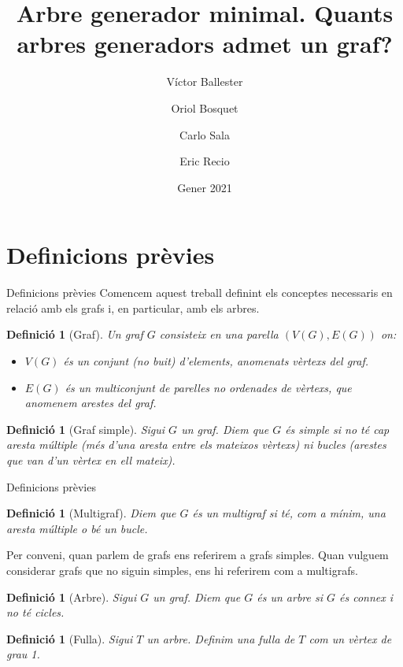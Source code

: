 \documentclass{beamer}
\institute[UAB]{Universitat Autònoma de Barcelona}
\title[Quants arbres generadors admet un graf?]{Arbre generador minimal. Quants arbres generadors admet un graf?}
\author[Víctor, Oriol, Eric, Carlo]{Víctor Ballester\and Oriol Bosquet \and Carlo Sala \and Eric Recio}
\date{Gener 2021}
\newtheorem{defin}[theorem]{Definició}
\begin{document}
\frame{\titlepage}
\section{Definicions prèvies}
\begin{frame}{Definicions prèvies}
    Comencem aquest treball definint els conceptes necessaris en relació amb els grafs i, en particular, amb els arbres.\pause
    \begin{defin}[Graf]
        \normalfont Un graf $G$ consisteix en una parella $(V(G), E(G))$ on:
        \begin{itemize}
            \item $V(G)$ és un conjunt (no buit) d'elements, anomenats vèrtexs del graf.
            \item $E(G)$ és un multiconjunt de parelles no ordenades de vèrtexs, que anomenem arestes del graf.
        \end{itemize}
    \end{defin}\pause
    \begin{defin}[Graf simple]
        \normalfont Sigui $G$ un graf. Diem que $G$ és simple si no té cap aresta múltiple (més d'una aresta entre els mateixos vèrtexs) ni bucles (arestes que van d'un vèrtex en ell mateix).
    \end{defin}
\end{frame}
\begin{frame}{Definicions prèvies}
    \begin{defin}[Multigraf]
        \normalfont Diem que $G$ és un multigraf si té, com a mínim, una aresta múltiple o bé un bucle.
    \end{defin}\pause
    Per conveni, quan parlem de grafs ens referirem a grafs simples. Quan vulguem considerar grafs que no siguin simples, ens hi referirem com a multigrafs.\pause
    \begin{defin}[Arbre]
        \normalfont Sigui $G$ un graf. Diem que $G$ és un arbre si $G$ és connex i no té cicles.
    \end{defin}\pause
    \begin{defin}[Fulla]
        \normalfont Sigui $T$ un arbre. Definim una fulla de $T$ com un vèrtex de grau 1.
    \end{defin}
\end{frame}
\end{document}
